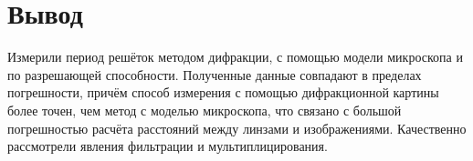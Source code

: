 \documentclass[a4paper,12pt]{article}
\begin{document}
\section*{Вывод}
Измерили период решёток методом дифракции, с помощью модели микроскопа и по разрешающей способности. Полученные данные совпадают в пределах погрешности, причём способ измерения с помощью дифракционной картины более точен, чем метод с моделью микроскопа, что связано с большой погрешностью расчёта расстояний между линзами и изображениями. Качественно рассмотрели явления фильтрации и мультиплицирования.
\end{document}
